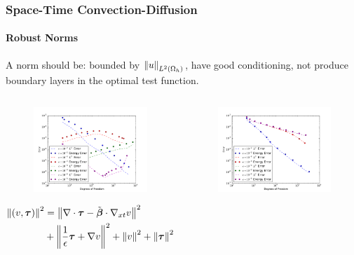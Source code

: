 \documentclass[18pt,xcolor=table]{beamer}
\begin{document}
\begin{frame}[t]
\frametitle{Space-Time Convection-Diffusion}
\framesubtitle{Robust Norms}
A norm should be: bounded by $\left\| u \right\|_{L^2\left( \Omega_h \right)}$, have good conditioning, not produce boundary layers in the optimal test function.
\vspace{-5ex}
\begin{columns}[t]
\begin{column}{0.5\textwidth}
\begin{figure}[t]
\centering
\includegraphics[width=\textwidth]{figs/SpaceTimeAnalyticalNorm0}
\end{figure}
\vspace{-5ex}
\small{
\begin{align*}
\left\| (v,\boldsymbol\tau) \right\|^2&=
\left\| \nabla\cdot\boldsymbol\tau-\tilde{\boldsymbol\beta}\cdot\nabla_{xt} v \right\|^2\\
&+\left\| \frac{1}{\epsilon}\boldsymbol\tau+\nabla v \right\|^2
+\left\| v \right\|^2
+\left\| \boldsymbol\tau \right\|^2
\end{align*}
}
\end{column}
\begin{column}{0.5\textwidth}
\begin{figure}[t]
\centering
\includegraphics[width=\textwidth]{figs/SpaceTimeAnalyticalNorm4}

\end{figure}
\end{column}
\end{columns}
\end{frame}
\end{document}
